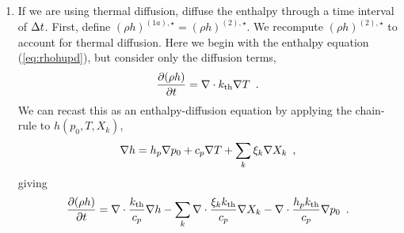 \begin{description}
\begin{enumerate}
\item If we are using thermal diffusion, diffuse the enthalpy through a time interval of 
$\Delta t$.  First, define $(\rho h)^{(1a),\star} = (\rho h)^{(2),\star}$.  We recompute
$(\rho h)^{(2),\star}$ to account for thermal diffusion.  Here we begin
with the enthalpy equation (\ref{eq:rhohupd}), but consider only the 
diffusion terms,
\begin{equation}
  \frac{\partial (\rho h)}{\partial t}  = 
 \nabla\cdot k_{\rm th}\nabla T 
\enskip . \label{eq:rhohupdthermal} 
  \end{equation}
We can recast this as an enthalpy-diffusion equation by applying the
chain-rule to $h(p_0,T,X_k)$,
\begin{equation}
\nabla h = h_p \nabla p_0 + c_p \nabla T + \sum_k \xi_k \nabla X_k \enskip ,
\end{equation}
giving
\begin{equation}
  \frac{\partial (\rho h)}{\partial t}  = 
 \nabla\cdot \frac{k_{\rm th}}{c_p}\nabla h -  
 \sum_k \nabla\cdot \frac{\xi_k k_{\rm th}}{c_p}\nabla X_k -
 \nabla\cdot \frac{h_p k_{\rm th}}{c_p}\nabla p_0 
\enskip . \label{eq:rhohupdthermal2} 
  \end{equation}


\end{enumerate}
\end{description}
